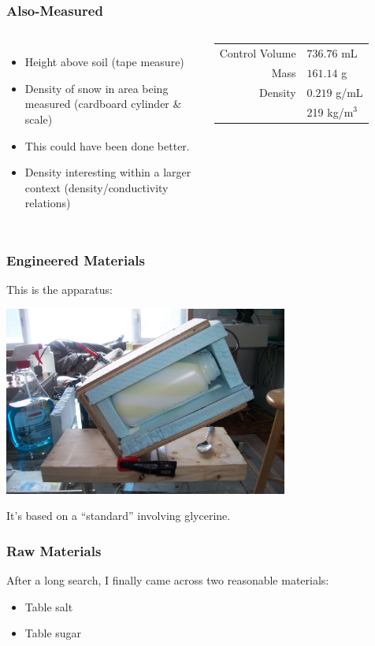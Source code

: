 \documentclass{beamer}
\begin{document}
\begin{frame}
\frametitle{Also-Measured}
\begin{columns}[c]
    \begin{itemize}
    \item Height above soil (tape measure)
    \item Density of snow in area being measured (cardboard cylinder \& scale)
    \item This could have been done better.
    \item Density interesting within a larger context (density/conductivity relations)
    \end{itemize}
    \begin{table}
    \begin{tabular}{r | l}
    Control Volume & \(736.76\) mL\\
    Mass & \(161.14\) g\\
    Density & \(0.219\) g/mL\\
    & 219 kg/\(\textrm{m}^3\)\\
    \end{tabular}
    \end{table}
\end{columns}
\end{frame}


\begin{frame}
\frametitle{Engineered Materials}
This is the apparatus:
\begin{center}
\includegraphics[width=0.7\textwidth]{fig/tilter_irl.jpg}
\end{center}
It's based on a ``standard'' involving glycerine.
\end{frame}


\begin{frame}
\frametitle{Raw Materials}
After a long search, I finally came across two reasonable materials:
\begin{itemize}
\item Table salt
\item Table sugar
\end{itemize}
\end{frame}
\end{document}
